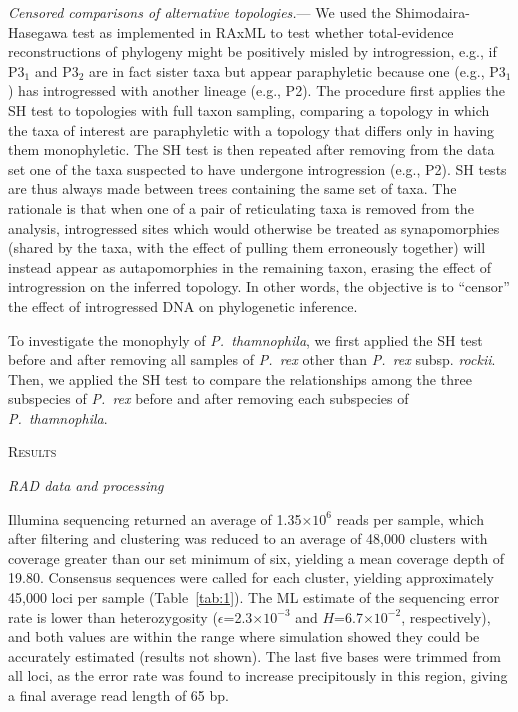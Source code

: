 \documentclass[12pt,letterpaper]{article}
\renewcommand{\section}[1]{%
\bigskip
\begin{center}
\begin{Large}
\normalfont\scshape #1
\medskip
\end{Large}
\end{center}}
\renewcommand{\subsection}[1]{%
\bigskip
\begin{center}
\begin{large}
\normalfont\itshape #1
\end{large}
\end{center}}
\renewcommand{\subsubsection}[1]{%
\vspace{2ex}
\noindent
\textit{#1.}---}
\providecommand{\e}[1]{\ensuremath{\times 10^{#1}}}
\begin{document}
\subsubsection{Censored comparisons of alternative topologies}
We used the Shimodaira-Hasegawa test \citep[SH
test;][]{shimodaira_multiple_1999} as implemented in RAxML to test
whether total-evidence reconstructions of phylogeny might be
positively misled by introgression, e.g., if P3$_1$ and P3$_2$ are in
fact sister taxa but appear paraphyletic because one (e.g., P3$_1$)
has introgressed with another lineage (e.g., P2). The procedure first
applies the SH test to topologies with full taxon sampling,
comparing a topology in which the taxa of interest are paraphyletic
with a topology that differs only in having them monophyletic.  The SH
test is then repeated after removing from the data set one of the taxa
suspected to have undergone introgression (e.g., P2). SH tests are
thus always made between trees containing the same set of taxa. The
rationale is that when one of a pair of reticulating taxa is removed
from the analysis, introgressed sites which would otherwise be treated
as synapomorphies (shared by the taxa, with the effect of pulling them
erroneously together) will instead appear as autapomorphies in the
remaining taxon, erasing the effect of introgression on the inferred
topology. In other words, the objective is to ``censor'' the effect of
introgressed DNA on phylogenetic inference.

To investigate the monophyly of \emph{P.~thamnophila}, we first
applied the SH test before and after removing all samples of
\emph{P.~rex} other than \emph{P.~rex} subsp. \emph{rockii}. Then, we
applied the SH test to compare the relationships among the three
subspecies of \emph{P.~rex} before and after removing each subspecies
of \emph{P.~thamnophila}. 

\section{Results}

\subsection{RAD data and processing}
Illumina sequencing returned an average of 1.35\e{6} reads per sample,
which after filtering and clustering was reduced to an average of
48,000 clusters \citep[or ``stacks'', following the terminology
of][]{emerson_resolving_2010} with coverage greater than our set
minimum of six, yielding a mean coverage depth of 19.80. Consensus
sequences were called for each cluster, yielding approximately 45,000
loci per sample (Table~\ref{tab:1}).  The ML estimate of the
sequencing error rate is lower than heterozygosity
($\epsilon$=2.3\e{-3} and $H$=6.7\e{-2}, respectively), and both
values are within the range where simulation showed they could be
accurately estimated (results not shown). The last five bases were
trimmed from all loci, as the error rate was found to increase
precipitously in this region, giving a final average read length of 65
bp.
\end{document}
